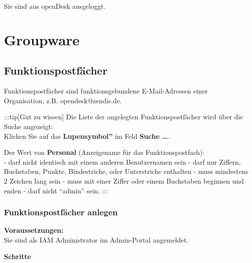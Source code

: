 \documentclass[
  letterpaper,
  DIV=11,
  numbers=noendperiod]{scrreprt}
\begin{document}
Sie sind aus openDesk ausgeloggt.

\chapter{Groupware}\label{groupware}

\section{Funktionspostfächer}\label{funktionspostfuxe4cher}

Funktionspostfächer sind funktionsgebundene E-Mail-Adressen einer
Organisation, z.B. opendesk@zendis.de.

:::tip{[}Gut zu wissen{]} Die Liste der angelegten Funktionspostfächer
wird über die Suche angezeigt:\\
Klicken Sie auf das \textbf{Lupensymbol''} im Feld \textbf{Suche
\ldots{}}.

Der Wert von \textbf{Personal} (Anzeigename für das
Funktionspostfach):\\
- darf nicht identisch mit einem anderen Benutzernamen sein - darf nur
Ziffern, Buchstaben, Punkte, Bindestriche, oder Unterstriche enthalten -
muss mindestens 2 Zeichen lang sein - muss mit einer Ziffer oder einem
Buchstaben beginnen und enden - darf nicht ``admin'' sein. :::

\subsection{Funktionspostfächer
anlegen}\label{funktionspostfuxe4cher-anlegen}

\textbf{Voraussetzungen:}\\
Sie sind als IAM Administrator im Admin-Portal angemeldet.

\textbf{Schritte}
\end{document}
